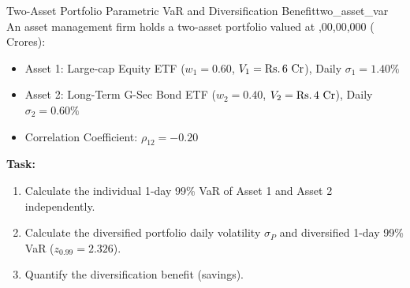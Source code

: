 \begin{example}{Two-Asset Portfolio Parametric VaR and Diversification Benefit}{two_asset_var}
An asset management firm holds a two-asset portfolio valued at ,00,00,000 ( Crores):
\begin{itemize}[leftmargin=1.5em, noitemsep]
    \item Asset 1: Large-cap Equity ETF ($w_1 = 0.60$, $V_1 = \text{Rs.}\, 6 \text{ Cr}$), Daily $\sigma_1 = 1.40\%$
    \item Asset 2: Long-Term G-Sec Bond ETF ($w_2 = 0.40$, $V_2 = \text{Rs.}\, 4 \text{ Cr}$), Daily $\sigma_2 = 0.60\%$
    \item Correlation Coefficient: $\rho_{12} = -0.20$
\end{itemize}

\textbf{Task:}
\begin{enumerate}[leftmargin=1.2em, itemsep=2pt]
    \item Calculate the individual 1-day 99\% VaR of Asset 1 and Asset 2 independently.
    \item Calculate the diversified portfolio daily volatility $\sigma_P$ and diversified 1-day 99\% VaR ($z_{0.99} = 2.326$).
    \item Quantify the diversification benefit (\inr savings).
\end{enumerate}


\end{example}
